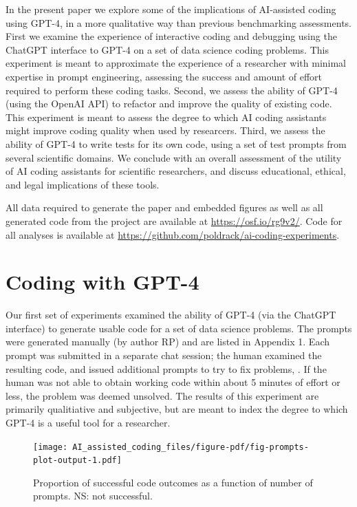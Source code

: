\documentclass[
]{article}
\begin{document}
In the present paper we explore some of the implications of AI-assisted
coding using GPT-4, in a more qualitative way than previous benchmarking
assessments. First we examine the experience of interactive coding and
debugging using the ChatGPT interface to GPT-4 on a set of data science
coding problems. This experiment is meant to approximate the experience
of a researcher with minimal expertise in prompt engineering, assessing
the success and amount of effort required to perform these coding tasks.
Second, we assess the ability of GPT-4 (using the OpenAI API) to
refactor and improve the quality of existing code. This experiment is
meant to assess the degree to which AI coding assistants might improve
coding quality when used by researcers. Third, we assess the ability of
GPT-4 to write tests for its own code, using a set of test prompts from
several scientific domains. We conclude with an overall assessment of
the utility of AI coding assistants for scientific researchers, and
discuss educational, ethical, and legal implications of these tools.

All data required to generate the paper and embedded figures as well as
all generated code from the project are available at
\url{https://osf.io/rg9v2/}. Code for all analyses is available at
\url{https://github.com/poldrack/ai-coding-experiments}.

\hypertarget{coding-with-gpt-4}{%
\section{Coding with GPT-4}\label{coding-with-gpt-4}}

Our first set of experiments examined the ability of GPT-4 (via the
ChatGPT interface) to generate usable code for a set of data science
problems. The prompts were generated manually (by author RP) and are
listed in Appendix 1. Each prompt was submitted in a separate chat
session; the human examined the resulting code, and issued additional
prompts to try to fix problems, . If the human was not able to obtain
working code within about 5 minutes of effort or less, the problem was
deemed unsolved. The results of this experiment are primarily
qualitiative and subjective, but are meant to index the degree to which
GPT-4 is a useful tool for a researcher.

\begin{figure}

{\centering \texttt{[image: AI\_assisted\_coding\_files/figure-pdf/fig-prompts-plot-output-1.pdf]}

}

\caption{\label{fig-prompts-plot}Proportion of successful code outcomes
as a function of number of prompts. NS: not successful.}

\end{figure}
\end{document}

